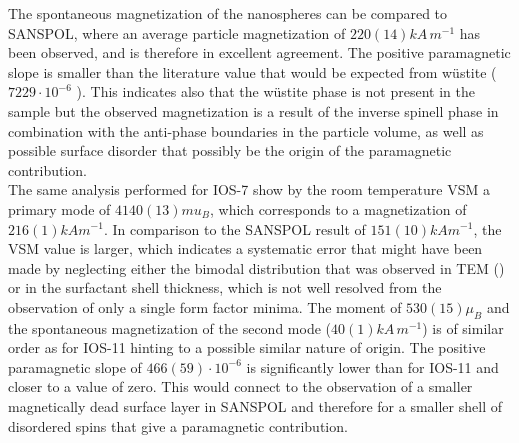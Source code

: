 \documentclass[\main/dresen_thesis.tex]{subfiles}
\begin{document}
  The spontaneous magnetization of the nanospheres can be compared to SANSPOL, where an average particle magnetization of $220(14) \unit{kA \, m^{-1}}$ has been observed, and is therefore in excellent agreement.
  The positive paramagnetic slope is smaller than the literature value that would be expected from w\"ustite ($7229 \cdot 10^{-6}$ \cite{Lide_2004_Handb}).
  This indicates also that the w\"ustite phase is not present in the sample but the observed magnetization is a result of the inverse spinell phase in combination with the anti-phase boundaries in the particle volume, as well as possible surface disorder that possibly be the origin of the paramagnetic contribution.
  \\

  The same analysis performed for IOS-7 show by the room temperature VSM a primary mode of $4140(13) \unit{mu_B}$, which corresponds to a magnetization of $216(1) \unit{kA m^{-1}}$.
  In comparison to the SANSPOL result of $151(10) \unit{kA m^{-1}}$, the VSM value is larger, which indicates a systematic error that might have been made by neglecting either the bimodal distribution that was observed in TEM () or in the surfactant shell thickness, which is not well resolved from the observation of only a single form factor minima.
  The moment of $530(15) \mu_B$ and the spontaneous magnetization of the second mode ($40(1) \unit{kA\,m^{-1}}$) is of similar order as for IOS-11 hinting to a possible similar nature of origin.
  The positive paramagnetic slope of $466(59) \cdot 10^{-6}$ is significantly lower than for IOS-11 and closer to a value of zero.
  This would connect to the observation of a smaller magnetically dead surface layer in SANSPOL and therefore for a smaller shell of disordered spins that give a paramagnetic contribution.
\end{document}
